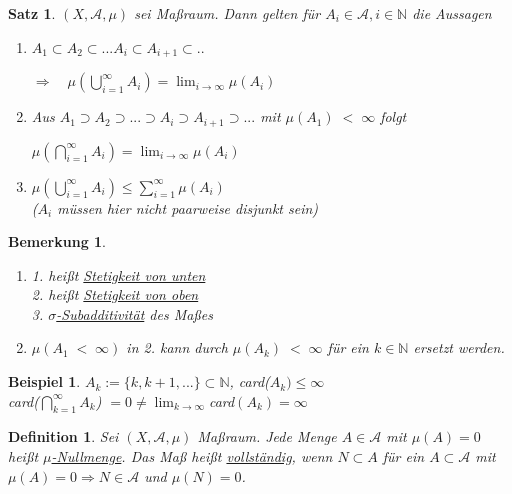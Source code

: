 \documentclass[11pt]{memoir}
\theoremstyle{changebreak}
\newtheorem{Definition}{Definition}[chapter]
\newtheorem{Bemerkung}{Bemerkung}[chapter]
\newtheorem{Beispiel}{Beispiel}[chapter]
\newtheorem{Satz}{Satz}[chapter]
\begin{document}
\begin{Satz}
$(X, \mathscr{A}, \mu)$ sei Maßraum. Dann gelten für $A_i \in \mathscr{A}, i \in \mathbb{N}$ die Aussagen
\begin{enumerate}
	\item $A_1 \subset A_2 \subset ...  A_i \subset A_{i+1} \subset .. $
	\begin{center}
		$\Rightarrow \quad \mu(\bigcup\limits_{i=1}^{\infty} A_i) = \lim_{i \rightarrow \infty} \mu(A_i)$
	\end{center}
	\item Aus $A_1 \supset A_2 \supset ... \supset A_i \supset A_{i+1} \supset ...$ mit $\mu(A_1)\; < \;  \infty$ folgt
	\begin{center}
		$\mu(\bigcap\limits_{i=1}^{\infty} A_i) = \lim_{i \rightarrow \infty} \mu(A_i)$
	\end{center}
	\item $\mu(\bigcup\limits_{i=1}^{\infty} A_i) \leq \sum\limits_{i=1}^{\infty} \mu(A_i)$ \\
	($A_i$ müssen hier nicht paarweise disjunkt sein)
\end{enumerate}
\end{Satz}

\begin{Bemerkung}
\begin{enumerate}
	\item \emph{1.} heißt \underline{Stetigkeit von unten} \\
	\emph{2.} heißt \underline{Stetigkeit von oben} \\
	\emph{3.} \underline{$\sigma$-Subadditivität} des Maßes
	\item  $\mu(A_1\; < \;\infty)$ in \emph{2.} kann durch $\mu(A_k) \; < \;\infty$ für ein $k \in \mathbb{N}$ ersetzt werden.
\end{enumerate}
\end{Bemerkung}

\begin{Beispiel}
$A_k := \{k, k+1, ... \} \subset \mathbb{N}$, card($A_k) \leq \infty$ \\
card($\bigcap\limits_{k=1}^{\infty} A_k$) $= 0 \ne \lim_{k \rightarrow \infty} $card$ (A_k) = \infty$
\end{Beispiel}

\begin{Definition}
Sei $(X, \mathscr{A}, \mu)$ Maßraum. Jede Menge $A \in \mathscr{A}$ mit $\mu(A) = 0$ heißt \underline{$\mu$-Nullmenge}. Das Maß heißt \underline{vollständig}, wenn $N \subset A $ für ein $A \subset \mathscr{A}$ mit $\mu(A) = 0 \Rightarrow N \in \mathscr{A}$ und $\mu(N) = 0$.
\end{Definition}
\end{document}
